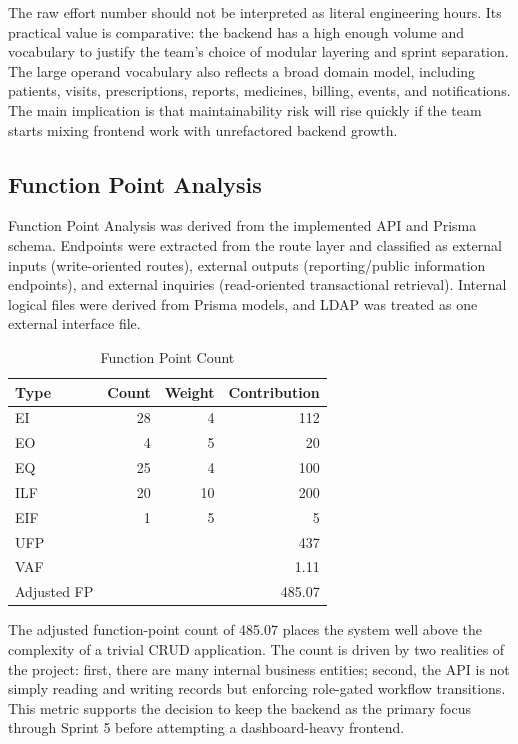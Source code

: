\documentclass[conference]{IEEEtran}
\begin{document}
The raw effort number should not be interpreted as literal engineering hours. Its practical value is comparative: the backend has a high enough volume and vocabulary to justify the team's choice of modular layering and sprint separation. The large operand vocabulary also reflects a broad domain model, including patients, visits, prescriptions, reports, medicines, billing, events, and notifications. The main implication is that maintainability risk will rise quickly if the team starts mixing frontend work with unrefactored backend growth.

\subsection{Function Point Analysis}
Function Point Analysis was derived from the implemented API and Prisma schema. Endpoints were extracted from the route layer and classified as external inputs (write-oriented routes), external outputs (reporting/public information endpoints), and external inquiries (read-oriented transactional retrieval). Internal logical files were derived from Prisma models, and LDAP was treated as one external interface file.

\begin{table}[htbp]
\caption{Function Point Count}
\centering
\footnotesize
\begin{tabular}{|l|r|r|r|}
\hline
\rowcolor{HeaderBlue}
\textbf{Type} & \textbf{Count} & \textbf{Weight} & \textbf{Contribution} \\
\hline
EI & 28 & 4 & 112 \\
EO & 4 & 5 & 20 \\
EQ & 25 & 4 & 100 \\
ILF & 20 & 10 & 200 \\
EIF & 1 & 5 & 5 \\
\hline
UFP & \multicolumn{3}{r}{437} \\
VAF & \multicolumn{3}{r}{1.11} \\
Adjusted FP & \multicolumn{3}{r}{485.07} \\
\hline
\end{tabular}
\label{tab:fpa}
\end{table}

The adjusted function-point count of 485.07 places the system well above the complexity of a trivial CRUD application. The count is driven by two realities of the project: first, there are many internal business entities; second, the API is not simply reading and writing records but enforcing role-gated workflow transitions. This metric supports the decision to keep the backend as the primary focus through Sprint 5 before attempting a dashboard-heavy frontend.
\end{document}
